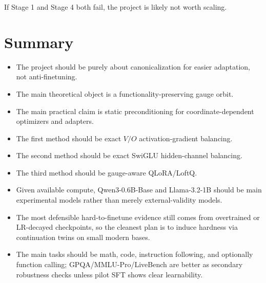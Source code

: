 \documentclass[11pt]{article}
\begin{document}
If Stage 1 and Stage 4 both fail, the project is likely not worth scaling.

\section{Summary}

\begin{itemize}[leftmargin=*]
    \item The project should be purely about canonicalization for easier adaptation, not anti-finetuning.
    \item The main theoretical object is a functionality-preserving gauge orbit.
    \item The main practical claim is static preconditioning for coordinate-dependent optimizers and adapters.
    \item The first method should be exact $V/O$ activation-gradient balancing.
    \item The second method should be exact SwiGLU hidden-channel balancing.
    \item The third method should be gauge-aware QLoRA/LoftQ.
    \item Given available compute, Qwen3-0.6B-Base and Llama-3.2-1B should be main experimental models rather than merely external-validity models.
    \item The most defensible hard-to-finetune evidence still comes from overtrained or LR-decayed checkpoints, so the cleanest plan is to induce hardness via continuation twins on small modern bases.
    \item The main tasks should be math, code, instruction following, and optionally function calling; GPQA/MMLU-Pro/LiveBench are better as secondary robustness checks unless pilot SFT shows clear learnability.
\end{itemize}
\end{document}
